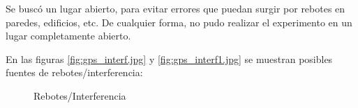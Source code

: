 \documentclass[spanish,12pt,a4paper,titlepage]{report}
\begin{document}
Se buscó un lugar abierto, para evitar errores que puedan surgir por rebotes en paredes, edificios, etc. De cualquier forma, no pudo realizar el experimento en un lugar completamente abierto.

En las figuras \ref{fig:gps_interf.jpg} y \ref{fig:gps_interf1.jpg} se muestran posibles fuentes de rebotes/interferencia:

\begin{figure} [h!]
  \centering
  \caption{Rebotes/Interferencia}
  \label{fig:rebotes}
\end{figure}


%
\end{document}
